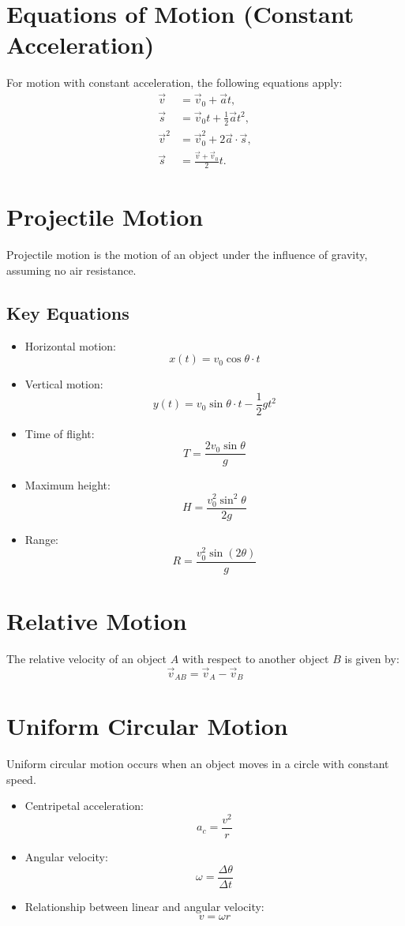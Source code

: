 \documentclass[a4paper,12pt]{article}
\begin{document}
\section{Equations of Motion (Constant Acceleration)}
For motion with constant acceleration, the following equations apply:
\begin{align*}
    \vec{v} &= \vec{v}_0 + \vec{a}t, \\
    \vec{s} &= \vec{v}_0t + \frac{1}{2}\vec{a}t^2, \\
    \vec{v}^2 &= \vec{v}_0^2 + 2\vec{a}\cdot\vec{s}, \\
    \vec{s} &= \frac{\vec{v} + \vec{v}_0}{2}t.
\end{align*}

\section{Projectile Motion}
Projectile motion is the motion of an object under the influence of gravity, assuming no air resistance.

\subsection{Key Equations}
\begin{itemize}
    \item Horizontal motion:
    \[
    x(t) = v_0 \cos\theta \cdot t
    \]
    \item Vertical motion:
    \[
    y(t) = v_0 \sin\theta \cdot t - \frac{1}{2}gt^2
    \]
    \item Time of flight:
    \[
    T = \frac{2v_0 \sin\theta}{g}
    \]
    \item Maximum height:
    \[
    H = \frac{v_0^2 \sin^2\theta}{2g}
    \]
    \item Range:
    \[
    R = \frac{v_0^2 \sin(2\theta)}{g}
    \]
\end{itemize}

\section{Relative Motion}
The relative velocity of an object \(A\) with respect to another object \(B\) is given by:
\[
\vec{v}_{AB} = \vec{v}_A - \vec{v}_B
\]

\section{Uniform Circular Motion}
Uniform circular motion occurs when an object moves in a circle with constant speed.
\begin{itemize}
    \item Centripetal acceleration:
    \[
    a_c = \frac{v^2}{r}
    \]
    \item Angular velocity:
    \[
    \omega = \frac{\Delta \theta}{\Delta t}
    \]
    \item Relationship between linear and angular velocity:
    \[
    v = \omega r
    \]
\end{itemize}
\end{document}

